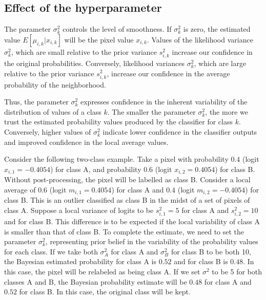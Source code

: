\documentclass[
  shortnames]{jss}
\begin{document}
\newpage

\hypertarget{effect-of-the-hyperparameter}{%
\subsection{Effect of the hyperparameter}\label{effect-of-the-hyperparameter}}

The parameter \(\sigma^2_k\) controls the level of smoothness. If \(\sigma^2_k\) is zero, the estimated value \({E}[\mu_{i,k} | x_{i,k}]\) will be the pixel value \(x_{i,k}\). Values of the likelihood variance \(\sigma^2_{k}\), which are small relative to the prior variance \(s^2_{i,k}\) increase our confidence in the original probabilities. Conversely, likelihood variances \(\sigma^2_{k}\), which are large relative to the prior variance \(s^2_{i,k}\), increase our confidence in the average probability of the neighborhood.

Thus, the parameter \(\sigma^2_{k}\) expresses confidence in the inherent variability of the distribution of values of a class \(k\). The smaller the parameter \(\sigma^2_{k}\), the more we trust the estimated probability values produced by the classifier for class \(k\).
Conversely, higher values of \(\sigma^2_{k}\) indicate lower confidence in the classifier outputs and improved confidence in the local average values.

Consider the following two-class example. Take a pixel with probability \(0.4\) (logit \(x_{i,1} = -0.4054\)) for class A, and probability \(0.6\) (logit \(x_{i,2} = 0.4054\)) for class B. Without post-processing, the pixel will be labelled as class B. Consider a local average of \(0.6\) (logit \(m_{i,1} = 0.4054\)) for class A and \(0.4\) (logit \(m_{i,2} = -0.4054\)) for class B. This is an outlier classified as class B in the midst of a set of pixels of class A. Suppose a local variance of logits to be \(s^2_{i,1} = 5\) for class A and \(s^2_{i,2} = 10\) and for class B. This difference is to be expected if the local variability of class A is smaller than that of class B. To complete the estimate, we need to set the parameter \(\sigma^2_{k}\), representing prior belief in the variability of the probability values for each class. If we take both \(\sigma^2_{A}\) for class A and \(\sigma^2_{B}\) for class B to be both 10, the Bayesian estimated probability for class A is \(0.52\) and for class B is \(0.48\). In this case, the pixel will be relabeled as being class A. If we set \(\sigma^2\) to be 5 for both classes A and B, the Bayesian probability estimate will be \(0.48\) for class A and \(0.52\) for class B. In this case, the original class will be kept.
\end{document}
